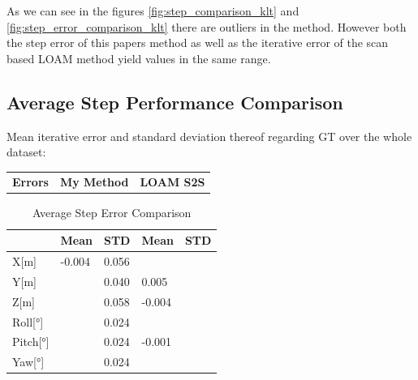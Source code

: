 {{    As we can see in the figures \cref{fig:step_comparison_klt} and \cref{fig:step_error_comparison_klt} there are outliers in the method. However both the step error of this papers method as well as the iterative error of the scan based LOAM method yield values in the same range.

    }

    \subsection{Average Step Performance Comparison}{
    Mean iterative error and standard deviation thereof regarding GT over the whole dataset:

        \vspace{0.5cm}
        
        \large
        \begin{tabular}{p{3cm} p{4.5cm} p{3.5cm} }
            \textbf{Errors} & \textbf{My Method} & \textbf{LOAM S2S}
        \end{tabular}

        \begin{table}[!ht]
            \setlength{\extrarowheight}{5pt}
            \centering
            \large
            \begin{tabular}{p{2cm} p{2cm} p{2cm} p{2cm} p{2cm} }
                \hline
                 & Mean & STD & Mean & STD\\[12pt]
                \hline
                X[m] & -0.004 & 0.056 & \text{\color{Green}{-0.002}} & \text{\color{Cyan}{0.035}}\\[3pt]
                \hline
                Y[m] & \text{\color{Green}{0}} & 0.040 & 0.005 & \text{\color{Cyan}{0.028}}\\[3pt]
                \hline
                Z[m] & \text{\color{Green}{-0.001}} & 0.058 & -0.004 & \text{\color{Cyan}{0.032}}\\[3pt]
                \hline
                Roll[°] & \text{\color{Green}{0}} & 0.024 & \text{\color{Green}{0}} & \text{\color{Cyan}{0.021}}\\[3pt]
                \hline
                Pitch[°] & \text{\color{Green}{0}} & 0.024 & -0.001 & \text{\color{Cyan}{0.020}}\\[3pt]
                \hline
                Yaw[°] & \text{\color{Green}{0}} & 0.024 & \text{\color{Green}{0}} & \text{\color{Cyan}{0.023}}\\[3pt]
            \end{tabular}
            \caption{Average Step Error Comparison}
            \label{tab:step_errors_klt}
        \end{table}

}}
